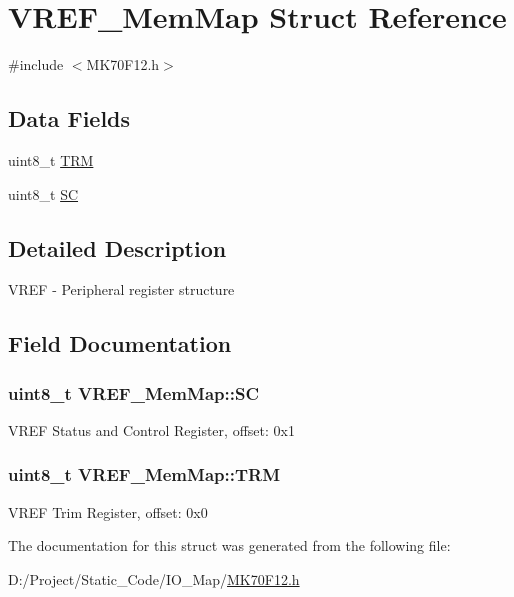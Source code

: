 \hypertarget{struct_v_r_e_f___mem_map}{}\section{V\+R\+E\+F\+\_\+\+Mem\+Map Struct Reference}
\label{struct_v_r_e_f___mem_map}


{\ttfamily \#include $<$M\+K70\+F12.\+h$>$}

\subsection*{Data Fields}
\begin{DoxyCompactItemize}
\item 
uint8\+\_\+t \hyperlink{struct_v_r_e_f___mem_map_a987ecd280eb0b25ff58841b304de2e1f}{T\+R\+M}
\item 
uint8\+\_\+t \hyperlink{struct_v_r_e_f___mem_map_a5d8e7e9026a69a14ff0d0b3caee5cf24}{S\+C}
\end{DoxyCompactItemize}


\subsection{Detailed Description}
V\+R\+E\+F -\/ Peripheral register structure 

\subsection{Field Documentation}
\hypertarget{struct_v_r_e_f___mem_map_a5d8e7e9026a69a14ff0d0b3caee5cf24}{}
\subsubsection[{S\+C}]{\setlength{\rightskip}{0pt plus 5cm}uint8\+\_\+t V\+R\+E\+F\+\_\+\+Mem\+Map\+::\+S\+C}\label{struct_v_r_e_f___mem_map_a5d8e7e9026a69a14ff0d0b3caee5cf24}
V\+R\+E\+F Status and Control Register, offset\+: 0x1 \hypertarget{struct_v_r_e_f___mem_map_a987ecd280eb0b25ff58841b304de2e1f}{}
\subsubsection[{T\+R\+M}]{\setlength{\rightskip}{0pt plus 5cm}uint8\+\_\+t V\+R\+E\+F\+\_\+\+Mem\+Map\+::\+T\+R\+M}\label{struct_v_r_e_f___mem_map_a987ecd280eb0b25ff58841b304de2e1f}
V\+R\+E\+F Trim Register, offset\+: 0x0 

The documentation for this struct was generated from the following file\+:\begin{DoxyCompactItemize}
\item 
D\+:/\+Project/\+Static\+\_\+\+Code/\+I\+O\+\_\+\+Map/\hyperlink{_m_k70_f12_8h}{M\+K70\+F12.\+h}\end{DoxyCompactItemize}
